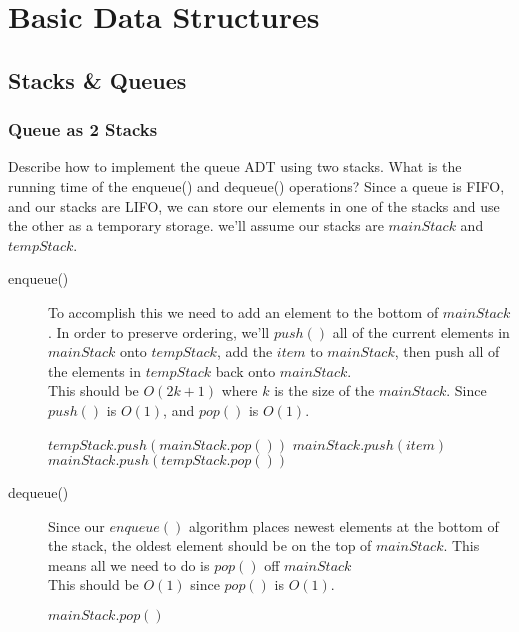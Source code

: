\documentclass[12pt]{article}
\begin{document}
\section{Basic Data Structures}
\subsection{Stacks \& Queues}
\subsubsection{Queue as 2 Stacks}
Describe how to implement the queue ADT using two stacks. What is the running time of the enqueue() and dequeue() operations?
\linebreak
\linebreak
Since a queue is FIFO, and our stacks are LIFO, we can store our elements in one of the stacks and use the other as a temporary storage. we'll assume our stacks are $ mainStack $ and $ tempStack $.

\begin{description}
	\item[enqueue()] To accomplish this we need to add an element to the bottom of $ mainStack $. In order to preserve ordering, we'll $ push() $ all of the current elements in $ mainStack $ onto $ tempStack $, add the $ item $ to $ mainStack $, then push all of the elements in $ tempStack $ back onto $ mainStack $. \\
		This should be $ O(2k+1) $ where $ k $ is the size of the $ mainStack $. Since $ push() $ is $ O(1) $, and $ pop() $ is $ O(1) $.
		\begin{algorithmic}
				\State $tempStack.push(mainStack.pop())$
			\EndWhile
			\State $mainStack.push(item)$
				\State $mainStack.push(tempStack.pop())$
			\EndWhile
		\end{algorithmic}
	\item[dequeue()] Since our $ enqueue() $ algorithm places newest elements at the bottom of the stack, the oldest element should be on the top of $ mainStack $. This means all we need to do is $ pop() $ off $ mainStack $ \\
		This should be $ O(1) $ since $ pop() $ is $ O(1) $.
		\begin{algorithmic}
			\State $mainStack.pop()$
		\end{algorithmic}
\end{description}
\end{document}
